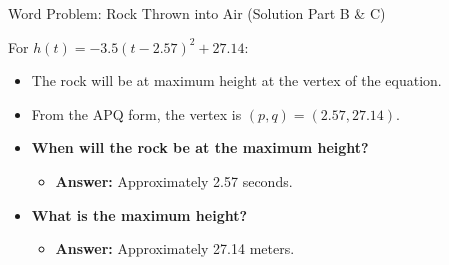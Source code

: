 \documentclass[aspectratio=169]{beamer}
\begin{document}
\begin{frame}{Word Problem: Rock Thrown into Air (Solution Part B & C)}
    \begin{tcolorbox}[colback=lightgray,colframe=accent,title=Solution Part B & C: Max Height]
        \footnotesize
        For $h(t) = -3.5(t - 2.57)^2 + 27.14$:
        \begin{itemize}
            \item The rock will be at maximum height at the vertex of the equation.
            \item From the APQ form, the vertex is $(p,q) = (2.57, 27.14)$.
            \item \textbf{When will the rock be at the maximum height?}
                \begin{itemize}
                    \item \textbf{Answer:} Approximately 2.57 seconds.
                \end{itemize}
            \item \textbf{What is the maximum height?}
                \begin{itemize}
                    \item \textbf{Answer:} Approximately 27.14 meters.
                \end{itemize}
        \end{itemize}
    \end{tcolorbox}
\end{frame}
\end{document}
